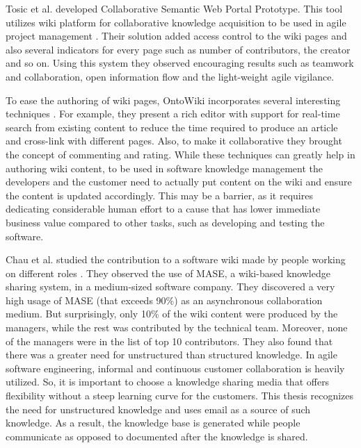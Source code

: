 Tosic et al. developed Collaborative Semantic Web Portal Prototype. This tool utilizes wiki platform for collaborative knowledge acquisition to be used in agile project management \cite{collaborative_knowledge}. Their solution added access control to the wiki pages and also several indicators for every page such as number of contributors, the creator and so on. Using this system they observed encouraging results such as teamwork and collaboration, open information flow and the light-weight agile vigilance. 

To ease the authoring of wiki pages, OntoWiki incorporates several interesting techniques \cite{ontowiki}. For example, they present a rich editor with support for real-time search from existing content to reduce the time required to produce an article and cross-link with different pages. Also, to make it collaborative they brought the concept of commenting and rating. While these techniques can greatly help in authoring wiki content, to be used in software knowledge management the developers and the customer need to actually put content on the wiki and ensure the content is updated accordingly. This may be a barrier, as it requires dedicating considerable human effort to a cause that has lower immediate business value compared to other tasks, such as developing and testing the software.

Chau et al. studied the contribution to a software wiki made by people working on different roles \cite{a_case_study_of_wiki}. They observed the use of MASE, a wiki-based knowledge sharing system, in a medium-sized software company. They discovered a very high usage of MASE (that exceeds 90\%) as an asynchronous collaboration medium. But surprisingly, only 10\% of the wiki content were produced by the managers, while the rest was contributed by the technical team. Moreover, none of the managers were in the list of top 10 contributors. They also found that there was a greater need for unstructured than structured knowledge. In agile software engineering, informal and continuous customer collaboration is heavily utilized. So, it is important to choose a knowledge sharing media that offers flexibility without a steep learning curve for the customers. This thesis recognizes the need for unstructured knowledge and uses email as a source of such knowledge. As a result, the knowledge base is generated while people communicate as opposed to documented after the knowledge is shared.

